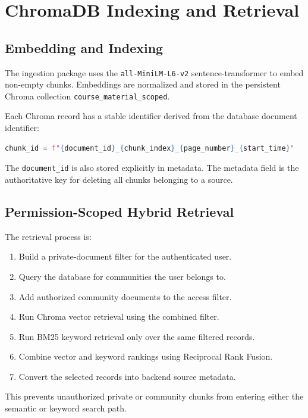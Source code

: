 \documentclass[11pt,a4paper]{article}
\begin{document}
\section{ChromaDB Indexing and Retrieval}

\subsection{Embedding and Indexing}

The ingestion package uses the \texttt{all-MiniLM-L6-v2} sentence-transformer
to embed non-empty chunks. Embeddings are normalized and stored in the
persistent Chroma collection \texttt{course\_material\_scoped}.

Each Chroma record has a stable identifier derived from the database document
identifier:

\begin{lstlisting}[language=Python]
chunk_id = f"{document_id}_{chunk_index}_{page_number}_{start_time}"
\end{lstlisting}

The \texttt{document\_id} is also stored explicitly in metadata. The metadata
field is the authoritative key for deleting all chunks belonging to a source.

\subsection{Permission-Scoped Hybrid Retrieval}

The retrieval process is:

\begin{enumerate}[leftmargin=*]
  \item Build a private-document filter for the authenticated user.
  \item Query the database for communities the user belongs to.
  \item Add authorized community documents to the access filter.
  \item Run Chroma vector retrieval using the combined filter.
  \item Run BM25 keyword retrieval only over the same filtered records.
  \item Combine vector and keyword rankings using Reciprocal Rank Fusion.
  \item Convert the selected records into backend source metadata.
\end{enumerate}

This prevents unauthorized private or community chunks from entering either
the semantic or keyword search path.
\end{document}
